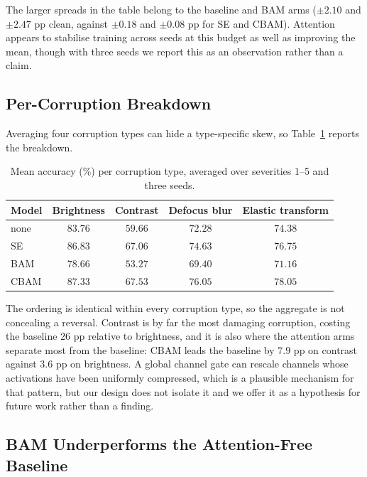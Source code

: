 \documentclass[10pt]{article}
\begin{document}
The larger spreads in the table belong to the baseline and BAM arms
($\pm2.10$ and $\pm2.47$ pp clean, against $\pm0.18$ and $\pm0.08$ pp for SE and
CBAM). Attention appears to stabilise training across seeds at this budget as
well as improving the mean, though with three seeds we report this as an
observation rather than a claim.

\subsection{Per-Corruption Breakdown}

Averaging four corruption types can hide a type-specific skew, so
Table~\ref{tab:percorr} reports the breakdown.

\begin{table}[t]
  \centering
  \caption{Mean accuracy (\%) per corruption type, averaged over severities
  1--5 and three seeds.}
  \label{tab:percorr}
  \small
  \begin{tabular}{lcccc}
    \toprule
    Model & Brightness & Contrast & Defocus blur & Elastic transform \\
    \midrule
    none & $83.76$ & $59.66$ & $72.28$ & $74.38$ \\
    SE   & $86.83$ & $67.06$ & $74.63$ & $76.75$ \\
    BAM  & $78.66$ & $53.27$ & $69.40$ & $71.16$ \\
    CBAM & $\mathbf{87.33}$ & $\mathbf{67.53}$ & $\mathbf{76.05}$ & $\mathbf{78.05}$ \\
    \bottomrule
  \end{tabular}
\end{table}

The ordering is identical within every corruption type, so the aggregate is not
concealing a reversal. Contrast is by far the most damaging corruption, costing
the baseline $26$ pp relative to brightness, and it is also where the attention
arms separate most from the baseline: CBAM leads the baseline by $7.9$ pp on
contrast against $3.6$ pp on brightness. A global channel gate can rescale
channels whose activations have been uniformly compressed, which is a plausible
mechanism for that pattern, but our design does not isolate it and we offer it
as a hypothesis for future work rather than a finding.

\subsection{BAM Underperforms the Attention-Free Baseline}
\label{sec:bam}
\end{document}
